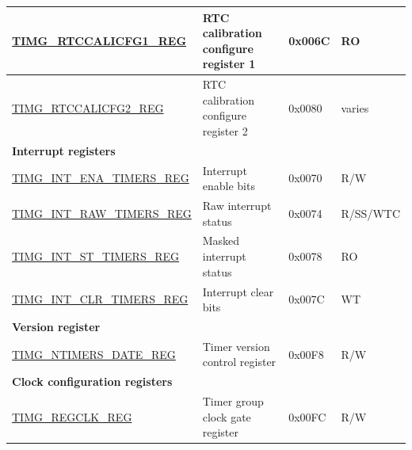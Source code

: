 \begin{longtable}{ | p{5.5cm} | p{7.5cm} | p{1.3cm} | p{1cm} | }
\hyperref[regdesc:TIMGRTCCALICFG1REG]{TIMG\_RTCCALICFG1\_REG} & RTC calibration configure register 1 & 0x006C & RO \\ \hline
\hyperref[regdesc:TIMGRTCCALICFG2REG]{TIMG\_RTCCALICFG2\_REG} & RTC calibration configure register 2 & 0x0080 & varies \\ \hline
\multicolumn{4}{|l|}{\textbf{Interrupt registers}} \\ \hline
\hyperref[regdesc:TIMGINTENATIMERSREG]{TIMG\_INT\_ENA\_TIMERS\_REG} & Interrupt enable bits & 0x0070 & R/W \\ \hline
\hyperref[regdesc:TIMGINTRAWTIMERSREG]{TIMG\_INT\_RAW\_TIMERS\_REG} & Raw interrupt status & 0x0074 & R/SS/WTC \\ \hline
\hyperref[regdesc:TIMGINTSTTIMERSREG]{TIMG\_INT\_ST\_TIMERS\_REG} & Masked interrupt status & 0x0078 & RO \\ \hline
\hyperref[regdesc:TIMGINTCLRTIMERSREG]{TIMG\_INT\_CLR\_TIMERS\_REG} & Interrupt clear bits & 0x007C & WT \\ \hline
\multicolumn{4}{|l|}{\textbf{Version register}} \\ \hline
\hyperref[regdesc:TIMGNTIMERSDATEREG]{TIMG\_NTIMERS\_DATE\_REG} & Timer version control register & 0x00F8 & R/W \\ \hline
\multicolumn{4}{|l|}{\textbf{Clock configuration registers}} \\ \hline
\hyperref[regdesc:TIMGREGCLKREG]{TIMG\_REGCLK\_REG} & Timer group clock gate register & 0x00FC & R/W \\ \hline
\end{longtable}
